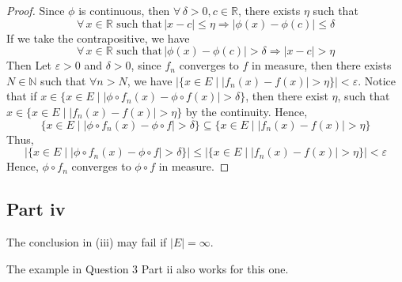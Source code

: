 \begin{answer}
    \begin{proof}
        Since $\phi$ is continuous, then $\forall\, \delta > 0, c \in \mathbb{R}$, there exists $\eta$ such that
        \begin{equation}
            \forall\, x \in \mathbb{R} \text{ such that}\, \lvert x - c \rvert \leq \eta \Rightarrow \lvert \phi (x) - \phi(c) \rvert \leq \delta
        \end{equation}
        If we take the contrapositive, we have 
        \begin{equation}
            \forall\, x \in \mathbb{R} \text{ such that}\, \lvert \phi (x) - \phi(c) \rvert > \delta \Rightarrow \lvert x - c \rvert > \eta 
        \end{equation}
        Then Let $\varepsilon > 0$ and $\delta > 0$, since $f_n$ converges to $f$ in measure, then there exists $N \in \mathbb{N}$ such that $\forall n > N$, we have $\lvert \{x \in E \mid \lvert f_n(x) - f(x) \rvert > \eta\}\rvert < \varepsilon$. Notice that if $x \in \{x \in E \mid \lvert \phi \circ f_n(x) - \phi \circ f(x) \rvert > \delta\}$, then there exist $\eta$, such that  $x \in \{x \in E \mid \lvert f_n(x) - f(x) \rvert > \eta\}$ by the continuity. Hence, 
        \begin{equation}
            \{x \in E \mid \lvert \phi \circ f_n(x) - \phi \circ f \rvert > \delta\} \subseteq \{x \in E \mid \lvert f_n(x) - f(x) \rvert > \eta\}
        \end{equation}
        Thus,
        \begin{equation}
            \lvert \{x \in E \mid \lvert \phi \circ f_n(x) - \phi \circ f \rvert > \delta\}\rvert \leq \lvert\{x \in E \mid \lvert f_n(x) - f(x) \rvert > \eta\}\rvert < \varepsilon
        \end{equation}
        Hence, $\phi\circ f_n$ converges to $\phi \circ f$ in measure.
    \end{proof}
\end{answer}

\subsection{Part iv}

\begin{question}
   The conclusion in (iii) may fail if $|E|=\infty$.
\end{question}

\begin{answer}
    The example in Question 3 Part ii also works for this one.
\end{answer}